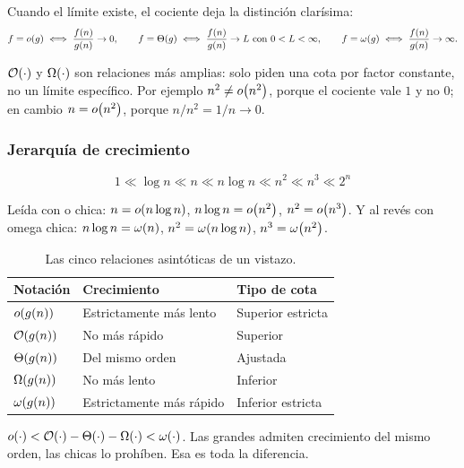 \documentclass[11pt,letterpaper]{article}
\begin{document}
Cuando el límite existe, el cociente deja la distinción clarísima:
\[
    f = o\!\left(g\right) \iff \frac{f(n)}{g(n)} \to 0, \qquad
    f = \Theta\!\left(g\right) \iff \frac{f(n)}{g(n)} \to L \text{ con }
    0 < L < \infty, \qquad
    f = \omega\!\left(g\right) \iff \frac{f(n)}{g(n)} \to \infty .
\]

$\mathcal{O}\!\left(\cdot\right)$ y $\Omega\!\left(\cdot\right)$ son relaciones más amplias: solo piden
una cota por factor constante, no un límite específico. Por ejemplo
$n^2 \neq o\!\left(n^2\right)$, porque el cociente vale $1$ y no $0$; en cambio
$n = o\!\left(n^2\right)$, porque $n/n^2 = 1/n \to 0$.

\subsubsection*{Jerarquía de crecimiento}

\[
    1 \ll \log n \ll n \ll n \log n \ll n^2 \ll n^3 \ll 2^n
\]

Leída con o chica: $n = o\!\left(n \log n\right)$,
$n \log n = o\!\left(n^2\right)$, $n^2 = o\!\left(n^3\right)$. Y al revés con omega
chica: $n \log n = \omega\!\left(n\right)$, $n^2 = \omega\!\left(n \log n\right)$,
$n^3 = \omega\!\left(n^2\right)$.

\begin{table}[htbp]
  \centering
  \small
  \begin{tabular}{lll}
    \toprule
    \textbf{Notación} & \textbf{Crecimiento} & \textbf{Tipo de cota} \\
    \midrule
    $o\!\left(g(n)\right)$   & Estrictamente más lento  & Superior estricta \\
    $\mathcal{O}\!\left(g(n)\right)$   & No más rápido            & Superior \\
    $\Theta\!\left(g(n)\right)$   & Del mismo orden          & Ajustada \\
    $\Omega\!\left(g(n)\right)$   & No más lento             & Inferior \\
    $\omega\!\left(g(n)\right)$   & Estrictamente más rápido & Inferior estricta \\
    \bottomrule
  \end{tabular}
  \caption{Las cinco relaciones asintóticas de un vistazo.}
  \label{tab:cinco}
\end{table}

\begin{idea}
    $o\!\left(\cdot\right) < \mathcal{O}\!\left(\cdot\right) - \Theta\!\left(\cdot\right) - \Omega\!\left(\cdot\right) <
    \omega\!\left(\cdot\right)$. Las grandes admiten crecimiento del mismo orden,
    las chicas lo prohíben. Esa es toda la diferencia.
\end{idea}

\end{document}
